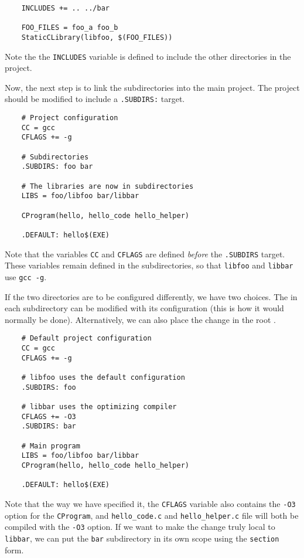 \begin{verbatim}
    INCLUDES += .. ../bar

    FOO_FILES = foo_a foo_b
    StaticCLibrary(libfoo, $(FOO_FILES))
\end{verbatim}

Note the the \verb+INCLUDES+ variable is defined to include the other directories in the project.

Now, the next step is to link the subdirectories into the main project.  The project 
should be modified to include a \verb+.SUBDIRS:+ target.

\begin{verbatim}
    # Project configuration
    CC = gcc
    CFLAGS += -g

    # Subdirectories
    .SUBDIRS: foo bar

    # The libraries are now in subdirectories
    LIBS = foo/libfoo bar/libbar

    CProgram(hello, hello_code hello_helper)

    .DEFAULT: hello$(EXE)
\end{verbatim}

Note that the variables \verb+CC+ and \verb+CFLAGS+ are defined \emph{before} the \verb+.SUBDIRS+
target.  These variables remain defined in the subdirectories, so that \verb+libfoo+ and \verb+libbar+
use \verb+gcc -g+.

If the two directories are to be configured differently, we have two choices.  The 
in each subdirectory can be modified with its configuration (this is how it would normally be done).
Alternatively, we can also place the change in the root .

\begin{verbatim}
    # Default project configuration
    CC = gcc
    CFLAGS += -g

    # libfoo uses the default configuration
    .SUBDIRS: foo

    # libbar uses the optimizing compiler
    CFLAGS += -O3
    .SUBDIRS: bar

    # Main program
    LIBS = foo/libfoo bar/libbar
    CProgram(hello, hello_code hello_helper)

    .DEFAULT: hello$(EXE)
\end{verbatim}

Note that the way we have specified it, the \verb+CFLAGS+ variable also contains the \verb+-O3+
option for the \verb+CProgram+, and \verb+hello_code.c+ and \verb+hello_helper.c+ file will both be
compiled with the \verb+-O3+ option.  If we want to make the change truly local to \verb+libbar+, we
can put the \verb+bar+ subdirectory in its own scope using the \verb+section+ form.

